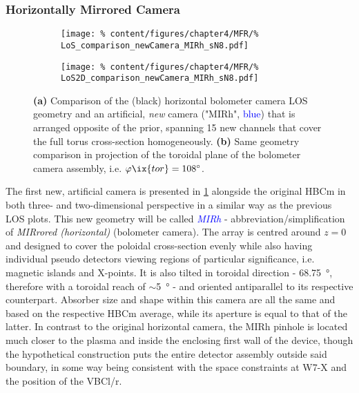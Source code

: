         \subsubsection*{Horizontally Mirrored Camera}%
%
            \begin{figure}[t]%
                \centering%
                \begin{subfigure}{0.4\textwidth}%
                    \texttt{[image: \%
                        content/figures/chapter4/MFR/\%
                        LoS\_comparison\_newCamera\_MIRh\_sN8.pdf]}%
                    \caption{}%
                \end{subfigure}%
                \hspace*{0.5cm}%
                \begin{subfigure}{0.5\textwidth}%
                    \texttt{[image: \%
                        content/figures/chapter4/MFR/\%
                        LoS2D\_comparison\_newCamera\_MIRh\_sN8.pdf]}%
                    \caption{}%
                \end{subfigure}%
                \caption{\textbf{(a)} Comparison of the (black) horizontal bolometer camera LOS geometry and an artificial, \textit{new} camera ("MIRh", \textcolor{blue}{blue}) that is arranged opposite of the prior, spanning 15 new channels that cover the full torus cross-section homogeneously. \textbf{(b)} Same geometry comparison in projection of the toroidal plane of the bolometer camera assembly, i.e. $\varphi\ix{tor}=108^{\circ}$.}\label{fig:geometry_newcam_mirh}%
            \end{figure}%
%
            The first new, artificial camera is presented in \cref{fig:geometry_newcam_mirh} alongside the original HBCm in both three- and two-dimensional perspective in a similar way as the previous LOS plots. This new geometry will be called \textit{\textcolor{blue}{MIRh}} - abbreviation/simplification of \textit{MIRrored (horizontal)} (bolometer camera). The array is centred around $z=0$ and designed to cover the poloidal cross-section evenly while also having individual pseudo detectors viewing regions of particular significance, i.e. magnetic islands and X-points. It is also tilted in toroidal direction  - \SI{68.75}{\degree}, therefore with a toroidal reach of $\sim$\SI{5}{\degree} - and oriented antiparallel to its respective counterpart. Absorber size and shape within this camera are all the same and based on the respective HBCm average, while its aperture is equal to that of the latter. In contrast to the original horizontal camera, the MIRh pinhole is located much closer to the plasma and inside the enclosing first wall of the device, though the hypothetical construction puts the entire detector assembly outside said boundary, in some way being consistent with the space constraints at W7-X and the position of the VBCl/r.\\%
%
